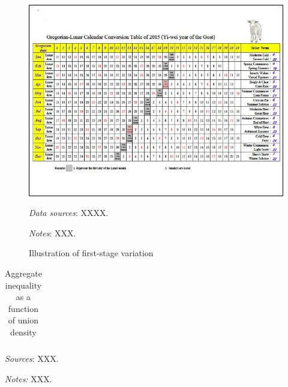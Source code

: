 \documentclass[12pt,pdftex, notitlepage]{article}
\let\footnotesize=\small
\begin{document}
\newpage \clearpage 


\begin{figure}[p]
	\caption{Illustration of first-stage variation} \label{fig-first-stage}
	\centerline{\includegraphics[width=7in]{figures/lunar-calendar.png}}
	\raggedright
	\footnotesize{\textit{Data sources}: XXXX. \\
\vspace{.3cm}	
\noindent \raggedright	\textit{Notes}:  XXX.}

\end{figure}



\begin{table}
\setlength{\tabcolsep}{1pt}
\def\sym#1{\ifmmode^{#1}\else\(^{#1}\)\fi}
\caption{Aggregate inequality as a function of union density \label{tab-main}}
\scriptsize{
\begin{tabular*}{1.0\hsize}{@{\hskip\tabcolsep\extracolsep\fill}l  cc cc cc cc   }
\toprule

\bottomrule
\end{tabular*}
}
\raggedright
\footnotesize{\textit{Sources}: XXX.

\vspace{.3cm}

\textit{Notes:} XXX.
}
\end{table}

\newpage \clearpage
\appendix
\makeatletter
\def\@seccntformat#1{\csname named#1\endcsname\csname the#1\endcsname.\quad}
\makeatother
\newcommand{\namedsection}{Appendix }

\end{document}
